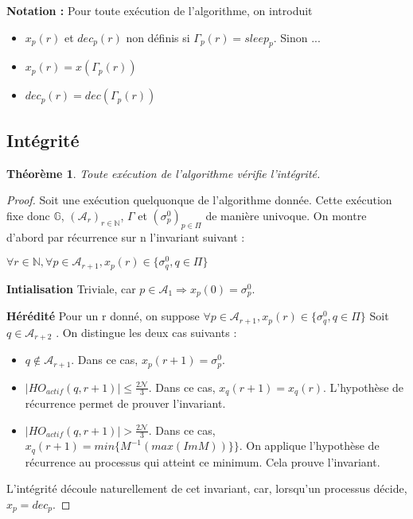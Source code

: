 \documentclass{article}
\newtheorem{theorem}{Théorème}
\begin{document}
\textbf{Notation :} Pour toute exécution de l'algorithme, on introduit
\begin{itemize}

	\item $x_p(r)$ et $dec_p(r)$ non définis si $\Gamma_p(r) = sleep_p$. Sinon ...
	\item $x_p(r) = x(\Gamma_p(r))$
	\item $dec_p(r) = dec(\Gamma_p(r))$

\end{itemize}

\subsection{Intégrité}

\begin{theorem}
	Toute exécution de l'algorithme vérifie l'intégrité.
\end{theorem}
\begin{proof}
	Soit une exécution quelquonque de l'algorithme donnée. Cette exécution fixe donc $\mathds{G}$, $(\mathcal{A}_r)_{r \in \mathds{N}}$, $\Gamma$ et $(\sigma^0_p)_{p \in \Pi}$ de manière univoque.
	On montre d'abord par récurrence sur n l'invariant suivant : 

	$  \forall r \in \mathds{N}, \forall p \in \mathcal{A}_{r+1}, x_p(r) \in \{\sigma^0_q, q \in \Pi\}$

\textbf{Intialisation}
	Triviale, car $p \in \mathcal{A}_1 \Rightarrow x_p(0) = \sigma^0_p$. 

\textbf{Hérédité}
	Pour un r donné, on suppose $\forall p \in \mathcal{A}_{r+1}, x_p(r) \in \{\sigma^0_q, q \in \Pi\}$
	Soit $q \in \mathcal{A}_{r+2}$ . On distingue les deux cas suivants :
\begin{itemize}
	\item $q \notin \mathcal{A}_{r+1}$. Dans ce cas, $x_p(r+1) = \sigma^0_p$.
	\item $|HO_{actif} (q, r+1) | \leq \frac{2\mathcal{N}}{3}$. Dans ce cas, $x_q(r+1) = x_q(r)$. L'hypothèse de récurrence permet de prouver l'invariant.
	\item $|HO_{actif} (q, r+1) | >    \frac{2\mathcal{N}}{3}$. Dans ce cas, $x_q(r+1) = min \{M^{-1} (max (Im M))\}\}$. On applique l'hypothèse de récurrence au processus qui atteint ce minimum.
		Cela prouve l'invariant.

\end{itemize}

L'intégrité découle naturellement de cet invariant, car, lorsqu'un processus décide, $x_p = dec_p$.
\end{proof}
\end{document}
